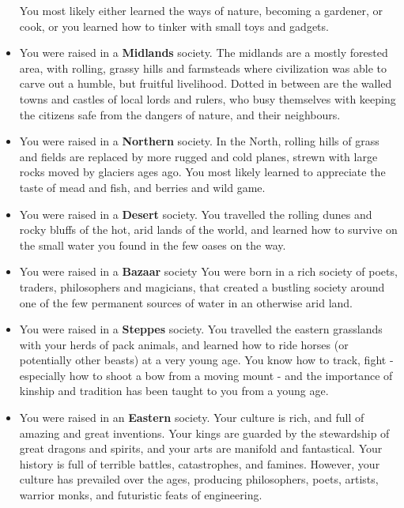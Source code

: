 \begin{itemize}
    You most likely either learned the ways of nature, becoming a gardener, or cook, or you learned how to tinker with small toys and gadgets.
    \item You were raised in a \textbf{Midlands} society.
    The midlands are a mostly forested area, with rolling, grassy hills and farmsteads where civilization was able to carve out a humble, but fruitful livelihood.
    Dotted in between are the walled towns and castles of local lords and rulers, who busy themselves with keeping the citizens safe from the dangers of nature, and their neighbours.
    \item You were raised in a \textbf{Northern} society.
    In the North, rolling hills of grass and fields are replaced by more rugged and cold planes, strewn with large rocks moved by glaciers ages ago.
    You most likely learned to appreciate the taste of mead and fish, and berries and wild game.
    \item You were raised in a \textbf{Desert} society.
    You travelled the rolling dunes and rocky bluffs of the hot, arid lands of the world, and learned how to survive on the small water you found in the few oases on the way.
    \item You were raised in a \textbf{Bazaar} society
    You were born in a rich society of poets, traders, philosophers and magicians, that created a bustling society around one of the few permanent sources of water in an otherwise arid land.
    \item You were raised in a \textbf{Steppes} society.
    You travelled the eastern grasslands with your herds of pack animals, and learned how to ride horses (or potentially other beasts) at a very young age.
    You know how to track, fight - especially how to shoot a bow from a moving mount - and the importance of kinship and tradition has been taught to you from a young age.
    \item You were raised in an \textbf{Eastern} society.
    Your culture is rich, and full of amazing and great inventions.
    Your kings are guarded by the stewardship of great dragons and spirits, and your arts are manifold and fantastical.
    Your history is full of terrible battles, catastrophes, and famines.
    However, your culture has prevailed over the ages, producing philosophers, poets, artists, warrior monks, and futuristic feats of engineering.
\end{itemize}